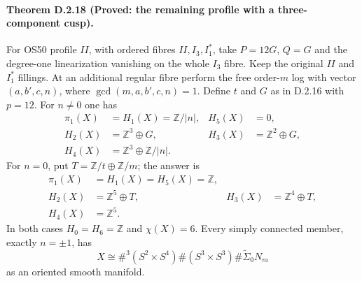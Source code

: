 \paragraph{Theorem D.2.18 (Proved: the remaining profile with a three-component cusp).}
For OS50 profile $II$, with ordered fibres $II,I_3,I_1^*$,
take $P=12G$, $Q=G$ and the degree-one linearization vanishing
on the whole $I_3$ fibre. Keep the original $II$ and $I_1^*$
fillings. At an additional regular fibre perform the free
order-$m$ log with vector $(a,b',c,n)$, where
$\gcd(m,a,b',c,n)=1$. Define $t$ and $G$ as in D.2.16 with
$p=12$. For $n\ne0$ one has
\[
\begin{aligned}
 \pi_1(X)&=H_1(X)=\mathbb Z/|n|, &H_5(X)&=0,\\
 H_2(X)&=\mathbb Z^3\oplus G,
 &H_3(X)&=\mathbb Z^2\oplus G,\\
 H_4(X)&=\mathbb Z^3\oplus\mathbb Z/|n|.
\end{aligned}
\tag{D.V1}
\]
For $n=0$, put $T=\mathbb Z/t\oplus\mathbb Z/m$; the answer is
\[
\begin{aligned}
 \pi_1(X)&=H_1(X)=H_5(X)=\mathbb Z,\\
 H_2(X)&=\mathbb Z^5\oplus T,
 &H_3(X)&=\mathbb Z^4\oplus T,\\
 H_4(X)&=\mathbb Z^5.
\end{aligned}
\tag{D.V2}
\]
In both cases $H_0=H_6=\mathbb Z$ and $\chi(X)=6$.
Every simply connected member, exactly $n=\pm1$, has
\[
 X\cong \#^3(S^2\times S^4)\#(S^3\times S^3)
                          \#\widetilde\Sigma_0N_m
 \tag{D.V3}
\]
as an oriented smooth manifold.
